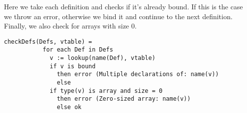 Here we take each definition and checks if it's already bound.
If this is the case we throw an error, otherwise we bind it and
continue to the next definition. Finally, we also check for arrays
with size 0. \\

\begin{verbatim}
checkDefs(Defs, vtable) =
           for each Def in Defs
             v := lookup(name(Def), vtable)
             if v is bound
               then error (Multiple declarations of: name(v))
               else
             if type(v) is array and size = 0
               then error (Zero-sized array: name(v))
               else ok
\end{verbatim}

